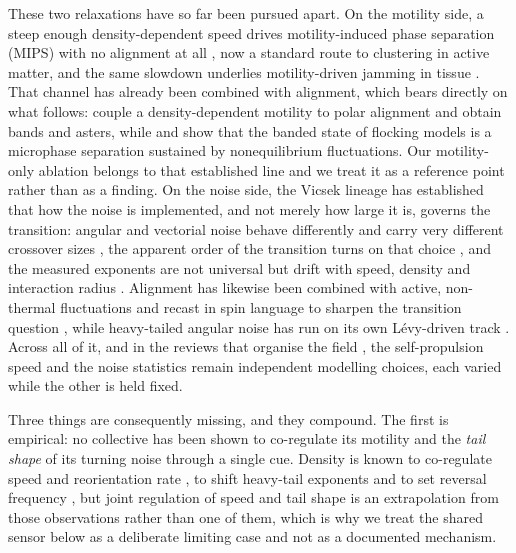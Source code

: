 \documentclass[11pt,a4paper]{article}
\begin{document}
These two relaxations have so far been pursued apart. On the
motility side, a steep enough density-dependent speed drives
motility-induced phase separation (MIPS) with no alignment at all
\citep{TailleurCates2008, Fily2012, Redner2013, CatesTailleur2013,
Stenhammar2014, CatesTailleur2015}, now a standard route to
clustering in active matter, and the same slowdown underlies
motility-driven jamming in tissue \citep{Bi2016}. That channel has
already been combined with alignment, which bears directly on
what follows: \citet{Farrell2012} couple a
density-dependent motility to polar alignment and obtain bands and
asters, while \citet{Solon2015PRL} and \citet{Solon2015PRE} show
that the banded state of flocking models is a microphase
separation sustained by nonequilibrium fluctuations. Our
motility-only ablation belongs to that established line and we
treat it as a reference point rather than as a finding. On the
noise side, the Vicsek
lineage has established that how the noise is implemented, and
not merely how large it is, governs the transition: angular and
vectorial noise behave differently and carry very different
crossover sizes \citep{Chate2008, Chate2008EPJB}, the apparent
order of the transition turns on that choice
\citep{Aldana2007, ChateComment2007, Nagy2007, Baglietto2009},
and the measured exponents are not universal but drift with
speed, density and interaction radius \citep{Cambui2016,
Baglietto2008, Baglietto2012, Holubec2021}. Alignment has
likewise been combined with active, non-thermal fluctuations
\citep{Grossmann2012, MartinGomez2018} and recast in spin
language to sharpen the transition question \citep{Solon2013},
while heavy-tailed angular noise has run on its own L\'evy-driven
track \citep{Eliazar2003, Ariel2015, Beer2019}. Across all of it,
and in the reviews that organise the field
\citep{Chate2020, Vicsek2012, Marchetti2013, Bechinger2016}, the
self-propulsion speed and the noise statistics remain independent
modelling choices, each varied while the other is held fixed.

Three things are consequently missing, and they compound. The
first is empirical: no collective has been shown to co-regulate
its motility and the \emph{tail shape} of its turning noise
through a single cue. Density is known to co-regulate speed and
reorientation rate \citep{Colin2019}, to shift heavy-tail
exponents \citep{Beer2020} and to set reversal frequency
\citep{Shi1996}, but joint regulation of speed and tail shape is
an extrapolation from those observations rather than one of them,
which is why we treat the shared sensor below as a deliberate
limiting case and not as a documented mechanism.
\end{document}
